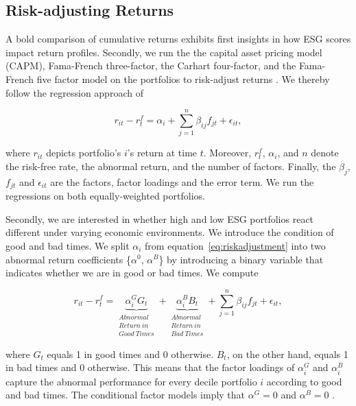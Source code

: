 \documentclass[11pt]{article}
\begin{document}
\subsection{Risk-adjusting Returns}

A bold comparison of cumulative returns exhibits first insights in how ESG scores impact return profiles. Secondly, we run the the capital asset pricing model (CAPM), Fama-French three-factor, the Carhart four-factor, and the Fama-French five factor model on the portfolios to risk-adjust returns \citep[see][]{Sharpe1964,Fama1992,Carhart1997,Fama2015}. We thereby follow the regression approach of


\begin{equation}
\label{eq:riskadjustment}
r_{it} - r_t^f = \alpha_i + \sum_{j=1}^{n} \beta_{ij} f_{jt} + \epsilon_{it},
\end{equation}

where $r_{it}$ depicts portfolio's $i$'s return at time $t$. Moreover, $r_t^f$, $\alpha_i$, and $n$ denote the risk-free rate, the abnormal return, and the number of factors. Finally, the $\beta_{j}$, $f_{jt}$ and $\epsilon_{it}$ are the factors, factor loadings and the error term. We run the regressions on both equally-weighted portfolios.

Secondly, we are interested in whether high and low ESG portfolios react different under varying economic environments. We introduce the condition of good and bad times. We split $\alpha_i$ from equation~\eqref{eq:riskadjustment} into two abnormal return coefficients \{$\alpha^0$, $\alpha^B$\} by introducing a binary variable that indicates whether we are in good or bad times. We compute 

\begin{equation}
\label{eq:goodandbadtimes}
r_{it} - r_t^f = 
	\underbrace{\alpha_i^{G} G_t}_{\substack{Abnormal\\Return~in\\Good~Times}} + 
	\underbrace{\alpha_i^{B} B_t}_{\substack{Abnormal\\Return~in\\Bad~Times}}  
	+ \sum_{j=1}^{n} \beta_{ij} f_{jt} + \epsilon_{it},
\end{equation}

where $G_t$ equals 1 in good times and 0 otherwise. $B_t$, on the other hand, equals 1 in bad times and 0 otherwise. This means that the factor loadings of $\alpha_i^{G}$ and $\alpha_i^{B}$ capture the abnormal performance for every decile portfolio $i$ according to good and bad times. The conditional factor models imply that $\alpha^G = 0$ and $\alpha^B = 0$ \citep[see, for example,][for similar applications]{Ferson2009, Christopherson1998}.
\end{document}
